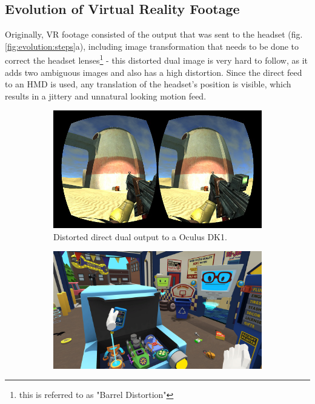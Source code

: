 \subsection{Evolution of Virtual Reality Footage}

Originally, VR footage consisted of the output that was sent to the headset 
(fig. \ref{fig:evolution:steps}a), including image transformation that needs to 
be done to correct the headset lenses\footnote{this is referred to as "Barrel 
Distortion"} - this distorted dual image is very hard to follow, as it adds two 
ambiguous images and also has a high distortion. Since the direct feed to an 
HMD is used, any translation of the headset's position is visible, which 
results in a jittery and unnatural looking motion feed.

\begin{figure}[htbp]
	\caption{Evolution of VR presentations over the recent years}
	\label{fig:evolution:steps}
	\centering
	\begin{subfigure}[t]{.45\textwidth}
		\includegraphics[width=\textwidth]{gfx/evolution/torque3d-bdist.png}
		\caption{Distorted direct dual output to a Oculus 
		DK1\cite{wyand:torqu3d:2013}.}
	\end{subfigure}
	\begin{subfigure}[t]{.45\textwidth}
		\includegraphics[width=\textwidth]{gfx/evolution/owlch-car.png}

\end{subfigure}
\end{figure}
